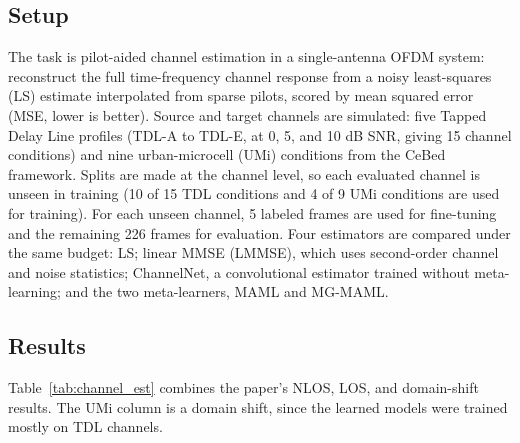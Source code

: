 \subsection{Setup}

The task is pilot-aided channel estimation in a single-antenna OFDM system: reconstruct the full time-frequency channel response from a noisy least-squares (LS) estimate interpolated from sparse pilots, scored by mean squared error (MSE, lower is better). Source and target channels are simulated: five Tapped Delay Line profiles (TDL-A to TDL-E, at 0, 5, and 10 dB SNR, giving 15 channel conditions) and nine urban-microcell (UMi) conditions from the CeBed framework. Splits are made at the channel level, so each evaluated channel is unseen in training (10 of 15 TDL conditions and 4 of 9 UMi conditions are used for training). For each unseen channel, 5 labeled frames are used for fine-tuning and the remaining 226 frames for evaluation. Four estimators are compared under the same budget: LS; linear MMSE (LMMSE), which uses second-order channel and noise statistics; ChannelNet, a convolutional estimator trained without meta-learning; and the two meta-learners, MAML and MG-MAML.

\subsection{Results}

Table~\ref{tab:channel_est} combines the paper's NLOS, LOS, and domain-shift results. The UMi column is a domain shift, since the learned models were trained mostly on TDL channels.

\begin{table}[htbp]
\centering
\caption{Few-shot (5-shot) channel estimation MSE; lower is better. TDL-A and TDL-C are rich-multipath NLOS channels, TDL-D and TDL-E are LOS-dominant, and UMi is a domain shift. Values are as reported by Roshan et al.~\cite{roshan2026channelestimation}.}
\label{tab:channel_est}
\small
{}
\end{table}

